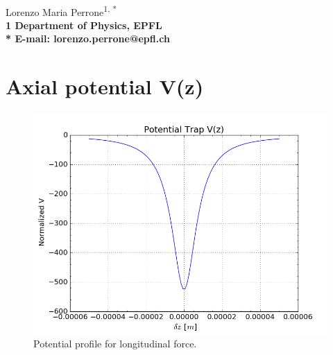 \documentclass[11pt,letterpaper]{article}
\begin{document}
\vspace*{0.30in}

\begin{flushleft}
{\Large
\textbf{}
}
\newline
\\
Lorenzo Maria Perrone\textsuperscript{1, *}
\\
\bf{1} Department of Physics, EPFL
\\

% 
%





* E-mail: lorenzo.perrone@epfl.ch
\end{flushleft}

\section{Axial potential V(z)}
\begin{figure}[!h]
\centering
\includegraphics[width=0.9\linewidth]{./V(z)}
\caption{Potential profile for longitudinal force.}
\label{fig:potential}
\end{figure}
\end{document}

